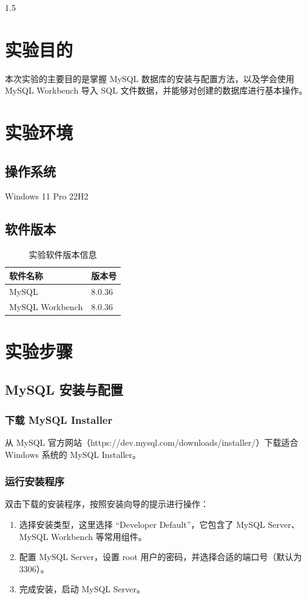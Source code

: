 \documentclass[a4paper,12pt]{report}
\begin{document}
\begin{spacing}{1.5}
\songti{}

\chapter{实验目的}
本次实验的主要目的是掌握 MySQL 数据库的安装与配置方法，以及学会使用 MySQL Workbench 导入 SQL 文件数据，并能够对创建的数据库进行基本操作。

\chapter{实验环境}
\section{操作系统}
Windows 11 Pro 22H2

\section{软件版本}
\begin{table}[H]
    \centering
    \begin{tabular}{|l|l|}
        \hline
        软件名称 & 版本号 \\
        \hline
        MySQL & 8.0.36 \\
        MySQL Workbench & 8.0.36 \\
        \hline
    \end{tabular}
    \caption{实验软件版本信息}
\end{table}

\chapter{实验步骤}
\section{MySQL 安装与配置}
\subsection{下载 MySQL Installer}
从 MySQL 官方网站（https://dev.mysql.com/downloads/installer/）下载适合 Windows 系统的 MySQL Installer。

\subsection{运行安装程序}
双击下载的安装程序，按照安装向导的提示进行操作：
\begin{enumerate}
    \item 选择安装类型，这里选择 “Developer Default”，它包含了 MySQL Server、MySQL Workbench 等常用组件。
    \item 配置 MySQL Server，设置 root 用户的密码，并选择合适的端口号（默认为 3306）。
    \item 完成安装，启动 MySQL Server。
\end{enumerate}


\end{spacing}
\end{document}
